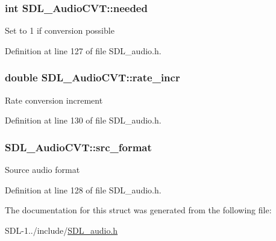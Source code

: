 \subsubsection[{needed}]{\setlength{\rightskip}{0pt plus 5cm}int S\+D\+L\+\_\+\+Audio\+C\+V\+T\+::needed}\label{struct_s_d_l___audio_c_v_t_ac600a035a48df05e14d3712fd6953ad4}
Set to 1 if conversion possible 

Definition at line 127 of file S\+D\+L\+\_\+audio.\+h.

\hypertarget{struct_s_d_l___audio_c_v_t_ad886122c23a6673073baace31bff3b6c}{}
\subsubsection[{rate\+\_\+incr}]{\setlength{\rightskip}{0pt plus 5cm}double S\+D\+L\+\_\+\+Audio\+C\+V\+T\+::rate\+\_\+incr}\label{struct_s_d_l___audio_c_v_t_ad886122c23a6673073baace31bff3b6c}
Rate conversion increment 

Definition at line 130 of file S\+D\+L\+\_\+audio.\+h.

\hypertarget{struct_s_d_l___audio_c_v_t_a06215f053474c02d9292b6c317af435c}{}
\subsubsection[{src\+\_\+format}]{ S\+D\+L\+\_\+\+Audio\+C\+V\+T\+::src\+\_\+format}\label{struct_s_d_l___audio_c_v_t_a06215f053474c02d9292b6c317af435c}
Source audio format 

Definition at line 128 of file S\+D\+L\+\_\+audio.\+h.



The documentation for this struct was generated from the following file\+:\begin{DoxyCompactItemize}
\item 
S\+D\+L-\/1../include/\hyperlink{_s_d_l__audio_8h}{S\+D\+L\+\_\+audio.\+h}\end{DoxyCompactItemize}
